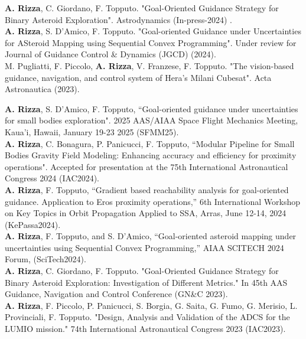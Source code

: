 \documentclass[
	a4paper,
	sidecolor=gray!8,
	sectioncolor=materialblue,
	subsectioncolor=materialindigo,
	profilepicsize=3.5cm,
	profilepicstyle=profilecircle,
	profilepiczoom=1.15,
]{sixtysecondscv}
\begin{document}

\textbf{A. Rizza}, C. Giordano, F. Topputo. "Goal-Oriented Guidance Strategy for Binary Asteroid Exploration".  Astrodynamics (In-press-2024) .\\

\textbf{A. Rizza}, S. D'Amico, F. Topputo. "Goal-oriented Guidance under Uncertainties for ASteroid Mapping using Sequential Convex Programming". Under review for Journal of Guidance Control \& Dynamics (JGCD) (2024).\\

M. Pugliatti, F. Piccolo, \textbf{A. Rizza}, V. Franzese, F. Topputo. "The vision-based guidance, navigation, and control system of Hera's Milani Cubesat". Acta Astronautica (2023).\\



\textbf{A. Rizza}, S. D'Amico, F. Topputo, “Goal-oriented guidance under uncertainties for small bodies exploration". 2025 AAS/AIAA Space Flight Mechanics Meeting,
Kaua'i, Hawaii, January 19-23 2025 (SFMM25). \\


\textbf{A. Rizza}, C. Bonagura, P. Panicucci, F. Topputo, “Modular Pipeline for Small Bodies Gravity Field Modeling: Enhancing accuracy and efficiency for proximity operations". Accepted for presentation at the 75th International Astronautical Congress 2024 (IAC2024). \\

\textbf{A. Rizza}, F. Topputo, “Gradient based reachability analysis for goal-oriented guidance. Application to Eros proximity operations,” 6th International Workshop on Key Topics in Orbit Propagation Applied to SSA, Arras, June 12-14, 2024 (KePassa2024). \\

\textbf{A. Rizza}, F. Topputo, and S. D’Amico, “Goal-oriented asteroid mapping under uncertainties using Sequential Convex Programming,” AIAA SCITECH 2024 Forum, (SciTech2024). \\

\textbf{A. Rizza}, C. Giordano, F. Topputo. "Goal-Oriented Guidance Strategy for Binary Asteroid Exploration: Investigation of Different Metrics." In 45th AAS Guidance, Navigation and Control Conference (GN\&C 2023).\\

\textbf{A. Rizza}, F. Piccolo, P. Panicucci, S. Borgia, G. Saita, G. Fumo, G. Merisio, L. Provinciali, F. Topputo. "Design, Analysis and Validation of the ADCS for the LUMIO mission." 74th International Astronautical Congress 2023 (IAC2023).\\
\end{document}
